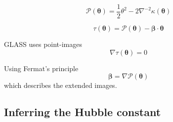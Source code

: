 
%
\begin{equation}
    \mathcal{P}(\bm\theta) = \frac{1}{2}\theta^{2} - 2\nabla^{-2}\kappa(\bm\theta)
\end{equation}
%

%
\begin{equation}
    \tau(\bm\theta) = \mathcal{P}(\bm\theta) - \bm\beta\cdot\bm\theta
\end{equation}
%


GLASS uses point-images
%
\begin{equation}
    \nabla\tau(\bm\theta) = 0
\end{equation}
%

Using Fermat's principle
%
\begin{equation}
    \bm\beta = \nabla\mathcal{P}(\bm\theta)
\end{equation}
%
which describes the extended images.


\subsection{Inferring the Hubble constant}

